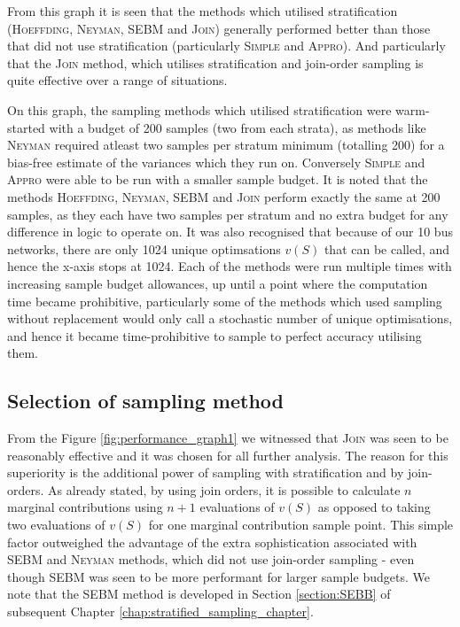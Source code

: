 From this graph it is seen that the methods which utilised stratification (\textsc{Hoeffding}, \textsc{Neyman}, \textsc{SEBM} and \textsc{Join})  generally performed better than those that did not use stratification (particularly \textsc{Simple} and \textsc{Appro}).
And particularly that the \textsc{Join} method, which utilises stratification and join-order sampling is quite effective over a range of situations.

On this graph, the sampling methods which utilised stratification were warm-started with a budget of 200 samples (two from each strata), as methods like \textsc{Neyman} required atleast two samples per stratum minimum (totalling 200) for a bias-free estimate of the variances which they run on.
Conversely \textsc{Simple} and \textsc{Appro} were able to be run with a smaller sample budget.
It is noted that the methods \textsc{Hoeffding}, \textsc{Neyman}, \textsc{SEBM} and \textsc{Join} perform exactly the same at 200 samples, as they each have two samples per stratum and no extra budget for any difference in logic to operate on.
It was also recognised that because of our 10 bus networks, there are only 1024 unique optimsations $v(S)$ that can be called, and hence the x-axis stops at 1024.
Each of the methods were run multiple times with increasing sample budget allowances, up until a point where the computation time became prohibitive, particularly some of the methods which used sampling without replacement would only call a stochastic number of unique optimisations, and hence it became time-prohibitive to sample to perfect accuracy utilising them.

\subsection{Selection of sampling method}\label{subsection:selection_of_sampling_method}

From the Figure \ref{fig:performance_graph1} we witnessed that \textsc{Join} was seen to be reasonably effective and it was chosen for all further analysis.
The reason for this superiority is the additional power of sampling with stratification and by join-orders.
As already stated, by using join orders, it is possible to calculate $n$ marginal contributions using $n+1$ evaluations of $v(S)$ as opposed to taking two evaluations of $v(S)$ for one marginal contribution sample point.
This simple factor outweighed the advantage of the extra sophistication associated with \textsc{SEBM} and \textsc{Neyman} methods, which did not use join-order sampling - even though SEBM was seen to be more performant for larger sample budgets.
We note that the \textsc{SEBM} method is developed in Section \ref{section:SEBB} of subsequent Chapter \ref{chap:stratified_sampling_chapter}.

